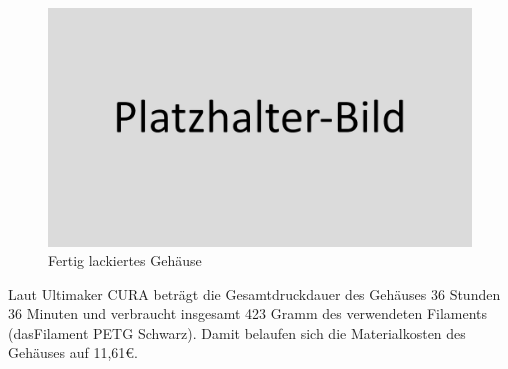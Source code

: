 \begin{figure}[h!tb]
	\includegraphics[width=1\textwidth]{img/placeholder.png}
	\caption[Fertig lackiertes Gehäuse]{Fertig lackiertes Gehäuse}
	\label{fig:finished_parts}
\end{figure}
Laut Ultimaker CURA beträgt die Gesamtdruckdauer des Gehäuses 36 Stunden 36 Minuten und verbraucht insgesamt 423 Gramm des verwendeten Filaments (dasFilament PETG Schwarz). Damit belaufen sich die Materialkosten des Gehäuses auf 11,61\euro{}.
\newpage